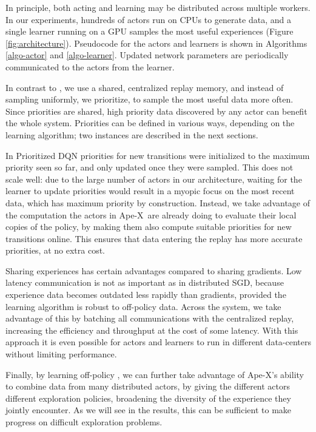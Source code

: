 \documentclass{article} \PassOptionsToPackage{usenames,dvipsnames}{xcolor}
\def\apex{Ape-X}
\begin{document}
In principle, both acting and learning may be distributed across multiple workers. In our experiments, hundreds of actors run on CPUs to generate data, and a single learner running on a GPU samples the most useful experiences (Figure \ref{fig:architecture}).  Pseudocode for the actors and learners is shown in Algorithms \ref{algo-actor} and \ref{algo-learner}. Updated network parameters are periodically communicated to the actors from the learner.

In contrast to \citet{gorila}, we use a shared, centralized replay memory, and instead of sampling uniformly, we prioritize, to sample the most useful data more often. Since priorities are shared, high priority data discovered by any actor can benefit the whole system. Priorities can be defined in various ways, depending on the learning algorithm; two instances are described in the next sections.

In Prioritized DQN \citep{prioritized-replay} priorities for new transitions were initialized to the maximum priority seen so far, and only updated once they were sampled. This does not scale well: due to the large number of actors in our architecture, waiting for the learner to update priorities would result in a myopic focus on the most recent data, which has maximum priority by construction. Instead, we take advantage of the computation the actors in \apex\ are already doing to evaluate their local copies of the policy, by making them also compute suitable priorities for new transitions online. This ensures that data entering the replay has more accurate priorities, at no extra cost.

Sharing experiences has certain advantages compared to sharing gradients. Low latency communication is not as important as in distributed SGD, because experience data becomes outdated less rapidly than gradients, provided the learning algorithm is robust to off-policy data. Across the system, we take advantage of this by batching all communications with the centralized replay, increasing the efficiency and throughput at the cost of some latency. With this approach it is even possible for actors and learners to run in different data-centers without limiting performance.

Finally, by learning off-policy \citep[cf.][]{SuttonBarto:1998,SuttonBarto:2017}, we can further take advantage of \apex's ability to combine data from many distributed actors, by giving the different actors different exploration policies, broadening the diversity of the experience they jointly encounter. As we will see in the results, this can be sufficient to make progress on difficult exploration problems.
\end{document}
